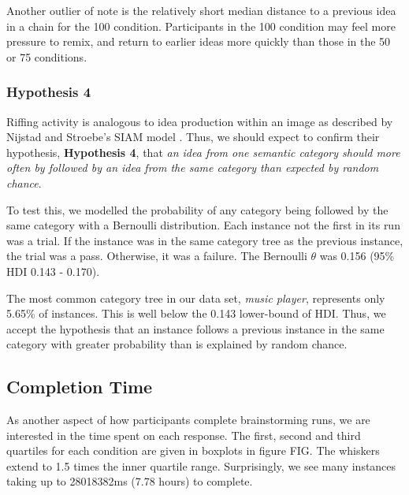 Another outlier of note is the relatively short median distance to a previous idea in a chain for the 100 condition. Participants in the 100 condition may feel more pressure to remix, and return to earlier ideas more quickly than those in the 50 or 75 conditions.

\subsubsection{Hypothesis 4}

Riffing activity is analogous to idea production within an image as described by Nijstad and Stroebe's SIAM model \cite{nijstad_how_2006}. Thus, we should expect to confirm their hypothesis, \textbf{Hypothesis 4}, that \emph{an idea from one semantic category should more often by followed by an idea from the same category than expected by random chance}.

To test this, we modelled the probability of any category being followed by the same category with a Bernoulli distribution. Each instance not the first in its run was a trial. If the instance was in the same category tree as the previous instance, the trial was a pass. Otherwise, it was a failure. The Bernoulli $\theta$ was 0.156 (95\% HDI 0.143 - 0.170).

The most common category tree in our data set, \emph{music player}, represents only 5.65\% of instances. This is well below the 0.143 lower-bound of HDI. Thus, we accept the hypothesis that an instance follows a previous instance in the same category with greater probability than is explained by random chance.

\subsection{Completion Time}

As another aspect of how participants complete brainstorming runs, we are interested in the time spent on each response. The first, second and third quartiles for each condition are given in boxplots in figure FIG. The whiskers extend to 1.5 times the inner quartile range. Surprisingly, we see many instances taking up to 28018382ms (7.78 hours) to complete.


